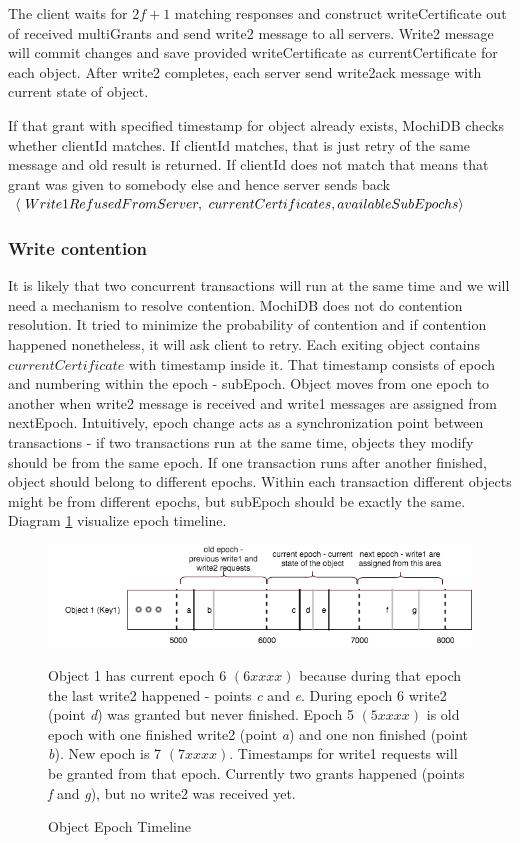 \documentclass[letterpaper,twocolumn,10pt]{article}
\begin{document}
The client waits for $2f+1$ matching responses and construct writeCertificate out of received multiGrants and send write2 message to all servers. Write2 message will commit changes and save provided writeCertificate as currentCertificate for each object. After write2 completes, each server send write2ack message with current state of object.

If that grant with specified timestamp for object already exists, MochiDB checks whether clientId matches. If clientId matches, that is just retry of the same message and old result is returned. If clientId does not match that means that grant was given to somebody else and hence server sends back
$\langle\ Write1RefusedFromServer,\ currentCertificates,\\ availableSubEpochs\rangle$


\subsubsection{Write contention} \label{write_contension}
It is likely that two concurrent transactions will run at the same time and we will need a mechanism to resolve contention. MochiDB does not do contention resolution. It tried to minimize the probability of contention and if contention happened nonetheless, it will ask client to retry.
Each exiting object contains $currentCertificate$ with timestamp inside it. That timestamp consists of epoch and numbering within the epoch - subEpoch. Object moves from one epoch to another when write2 message is received and write1 messages are assigned from nextEpoch. Intuitively, epoch change acts as a synchronization point between transactions - if two transactions run at the same time, objects they modify should be from the same epoch. If one transaction runs after another finished, object should belong to different epochs. Within each transaction different objects might be from different epochs, but subEpoch should be exactly the same. Diagram \ref{fig:epochs_view} visualize epoch timeline. 

\begin{figure}
\includegraphics[width=\textwidth]{Epochs.png}
\label{fig:epochs_view}
\caption{Object Epoch Timeline}
\small Object 1 has current epoch 6 $\left(6xxxx\right)$ because during that epoch the last write2 happened - points \textit{c} and \textit{e}. During epoch 6 write2 (point \textit{d}) was granted but never finished. Epoch 5 $\left(5xxxx\right)$ is old epoch with one finished write2 (point \textit{a}) and one non finished (point \textit{b}). New epoch is 7 $\left(7xxxx\right)$. Timestamps for write1 requests will be granted from that epoch. Currently two grants happened (points \textit{f} and \textit{g}), but no write2 was received yet.
\centering
\end{figure}
\end{document}
